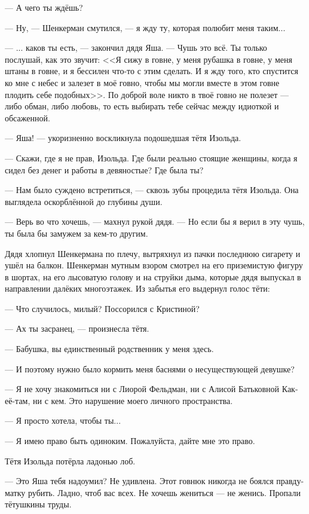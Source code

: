 \documentclass[a4paper,10pt,fleqn]{book}\usepackage{polyglossia}\setdefaultlanguage{english}\setotherlanguage{russian}\defaultfontfeatures{Ligatures=TeX,Mapping=tex-text} \usepackage{xcolor}\definecolor{lightgray}{HTML}{bbbbbb}\color{lightgray}\newcommand{\ml}[3]{\textcolor{black}{#3}}
\newcommand{\asterism}{\vspace{1em}{\centering\Large\bfseries$\ast~\ast~\ast$\par}\vspace{1em}}
\begin{document}
--- А чего ты ждёшь?

--- Ну, --- Шенкерман смутился, --- я жду ту, которая полюбит меня таким...

---  ... каков ты есть, --- закончил дядя Яша.
--- Чушь это всё.
Ты только послушай, как это звучит: <<Я сижу в говне, у меня рубашка в говне, у меня штаны в говне, и я бессилен что-то с этим сделать.
И я жду того, кто спустится ко мне с небес и залезет в моё говно, чтобы мы могли вместе в этом говне плодить себе подобных>>.
По доброй воле никто в твоё говно не полезет --- либо обман, либо любовь, то есть выбирать тебе сейчас между идиоткой и обсаженной.

--- Яша! --- укоризненно воскликнула подошедшая тётя Изольда.

--- Скажи, где я не прав, Изольда.
Где были реально стоящие женщины, когда я сидел без денег и работы в девяностые?
Где была ты?

--- Нам было суждено встретиться, --- сквозь зубы процедила тётя Изольда.
Она выглядела оскорблённой до глубины души.

--- Верь во что хочешь, --- махнул рукой дядя.
--- Но если бы я верил в эту чушь, ты была бы замужем за кем-то другим.

Дядя хлопнул Шенкермана по плечу, вытряхнул из пачки последнюю сигарету и ушёл на балкон.
Шенкерман мутным взором смотрел на его приземистую фигуру в шортах, на его лысоватую голову и на струйки дыма, которые дядя выпускал в направлении далёких многоэтажек.
Из забытья его выдернул голос тёти:

--- Что случилось, милый?
Поссорился с Кристиной?

\asterism

--- Ах ты засранец, --- произнесла тётя.

--- Бабушка, вы единственный родственник у меня здесь.

--- И поэтому нужно было кормить меня баснями о несуществующей девушке?

--- Я не хочу знакомиться ни с Лиорой Фельдман, ни с Алисой Батьковной Как-её-там, ни с кем.
Это нарушение моего личного пространства.

--- Я просто хотела, чтобы ты...

--- Я имею право быть одиноким.
Пожалуйста, дайте мне это право.

Тётя Изольда потёрла ладонью лоб.

--- Это Яша тебя надоумил?
Не удивлена.
Этот говнюк никогда не боялся правду-матку рубить.
Ладно, чтоб вас всех.
Не хочешь жениться --- не женись.
Пропали тётушкины труды.
\end{document}
